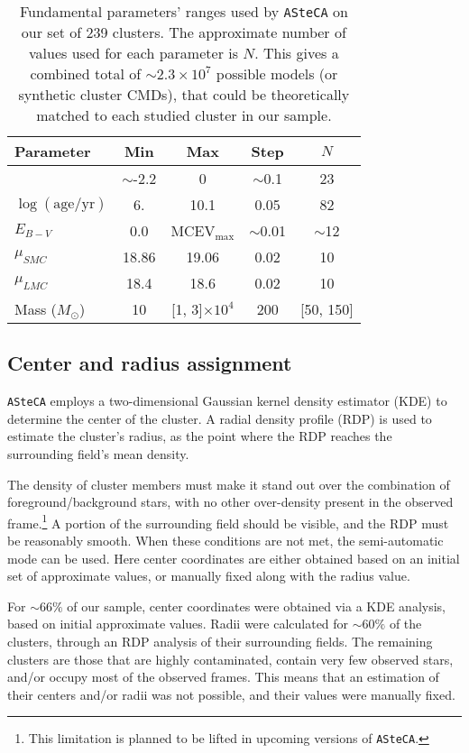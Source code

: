 \documentclass{aa}
\begin{document}
\begin{table}
\centering
\caption{Fundamental parameters' ranges used by \texttt{ASteCA} on our set
of 239 clusters. The approximate number of values used for each parameter is
$N$. This gives a combined total of ${\sim}2.3 {\times}10^7$ possible models 
(or synthetic cluster CMDs), that could be theoretically matched to each studied
cluster in our sample.}
\label{tab:ga-range}
\begin{tabular}{lcccc}
\hline\hline
 Parameter & Min & Max & Step & $N$\\
\hline
[Fe/H] & $\sim$-2.2 & 0 & $\sim$0.1 & 23\\
$\log\mathrm{(age/yr)}$ & 6. & 10.1 & 0.05 & 82\\
$E_{B-V}$ & 0.0 & MCEV$_{\max}$ & ${\sim}$0.01 & $\sim$12\\
$\mu_{SMC}$ & 18.86 & 19.06 & 0.02 & 10\\
$\mu_{LMC}$ & 18.4 & 18.6 & 0.02 & 10\\
Mass ($M_{\odot}$) & 10 & [1, 3]${\times}10^{4}$ & 200 & [50, 150]\\
\hline
\end{tabular}
\end{table}



\subsection{Center and radius assignment}
\label{ssec:centre-radius}

\texttt{ASteCA} employs a two-dimensional Gaussian kernel density estimator 
(KDE) to determine the center of the cluster. A radial density profile (RDP) is
used to estimate the cluster's radius, as the point where the RDP reaches the
surrounding field's mean density.

The density of cluster members must make it stand out over the combination of
foreground/background stars, with no other over-density present in the observed
frame.\footnote{This limitation is planned to be lifted in upcoming versions of
\texttt{ASteCA}.} A portion of the surrounding field should be visible, and the
RDP must be reasonably smooth.
%
When these conditions are not met, the semi-automatic mode can be used. Here
center coordinates are either obtained based on an initial set of approximate
values, or manually fixed along with the radius value.

For ${\sim}66\%$ of our sample, center coordinates were obtained via a KDE
analysis, based on initial approximate values. Radii were calculated for
${\sim}60\%$ of the clusters, through an RDP analysis of their surrounding
fields.
%
The remaining clusters are those that are highly contaminated, contain very few
observed stars, and/or occupy most of the observed frames. This means that an
estimation of their centers and/or radii was not possible, and their values
were manually fixed.
\end{document}
